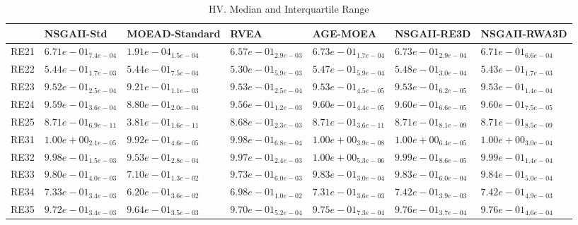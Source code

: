 \documentclass{article}
\begin{document}
\begin{table}
\caption{HV. Median and Interquartile Range}
\label{table: HV}
\centering
\begin{scriptsize}
\begin{tabular}{lllllll}
\hline & NSGAII-Std & MOEAD-Standard & RVEA & AGE-MOEA & NSGAII-RE3D &  NSGAII-RWA3D\\
\hline 
RE21 & $  6.71e-01_{ 7.4e-04}$ & $  1.91e-04_{ 1.5e-04}$ & $  6.57e-01_{ 2.9e-03}$ & \cellcolor{gray95}$  6.73e-01_{ 1.7e-04}$ & \cellcolor{gray25}$  6.73e-01_{ 2.9e-04}$ & $  6.71e-01_{ 6.6e-04}$ \\
RE22 & $  5.44e-01_{ 1.7e-03}$ & $  5.44e-01_{ 7.5e-04}$ & $  5.30e-01_{ 5.9e-03}$ & \cellcolor{gray25}$  5.47e-01_{ 5.9e-04}$ & \cellcolor{gray95}$  5.48e-01_{ 3.0e-04}$ & $  5.43e-01_{ 1.7e-03}$ \\
RE23 & $  9.52e-01_{ 2.5e-04}$ & $  9.21e-01_{ 1.1e-03}$ & \cellcolor{gray25}$  9.53e-01_{ 2.5e-04}$ & $  9.53e-01_{ 4.5e-05}$ & \cellcolor{gray95}$  9.53e-01_{ 6.2e-05}$ & $  9.53e-01_{ 1.4e-04}$ \\
RE24 & $  9.59e-01_{ 3.6e-04}$ & $  8.80e-01_{ 2.0e-04}$ & $  9.56e-01_{ 1.2e-03}$ & \cellcolor{gray95}$  9.60e-01_{ 4.4e-05}$ & \cellcolor{gray25}$  9.60e-01_{ 6.6e-05}$ & $  9.60e-01_{ 7.5e-05}$ \\
RE25 & \cellcolor{gray25}$  8.71e-01_{ 6.9e-11}$ & $  3.81e-01_{ 1.6e-11}$ & $  8.68e-01_{ 2.3e-03}$ & \cellcolor{gray95}$  8.71e-01_{ 3.6e-11}$ & $  8.71e-01_{ 8.1e-09}$ & $  8.71e-01_{ 8.5e-09}$ \\
RE31 & \cellcolor{gray25}$  1.00e+00_{ 2.1e-05}$ & $  9.92e-01_{ 4.6e-05}$ & $  9.98e-01_{ 6.8e-04}$ & \cellcolor{gray95}$  1.00e+00_{ 3.9e-08}$ & $  1.00e+00_{ 6.4e-05}$ & $  1.00e+00_{ 3.0e-04}$ \\
RE32 & $  9.98e-01_{ 1.5e-03}$ & $  9.53e-01_{ 2.8e-04}$ & $  9.97e-01_{ 2.4e-03}$ & \cellcolor{gray95}$  1.00e+00_{ 5.3e-06}$ & \cellcolor{gray25}$  9.99e-01_{ 8.6e-05}$ & $  9.99e-01_{ 1.4e-04}$ \\
RE33 & $  9.80e-01_{ 4.0e-03}$ & $  7.10e-01_{ 1.3e-02}$ & $  9.73e-01_{ 6.0e-03}$ & $  9.83e-01_{ 3.0e-04}$ & \cellcolor{gray25}$  9.83e-01_{ 6.0e-04}$ & \cellcolor{gray95}$  9.84e-01_{ 5.0e-04}$ \\
RE34 & $  7.33e-01_{ 3.4e-03}$ & $  6.20e-01_{ 3.6e-02}$ & $  6.98e-01_{ 1.0e-02}$ & $  7.31e-01_{ 3.6e-03}$ & \cellcolor{gray95}$  7.42e-01_{ 3.9e-03}$ & \cellcolor{gray25}$  7.42e-01_{ 4.9e-03}$ \\
RE35 & $  9.72e-01_{ 3.4e-03}$ & $  9.64e-01_{ 3.5e-03}$ & $  9.70e-01_{ 5.2e-04}$ & $  9.75e-01_{ 7.3e-04}$ & \cellcolor{gray95}$  9.76e-01_{ 3.7e-04}$ & \cellcolor{gray25}$  9.76e-01_{ 4.6e-04}$ \\

\end{tabular}
\end{scriptsize}
\end{table}
\end{document}
